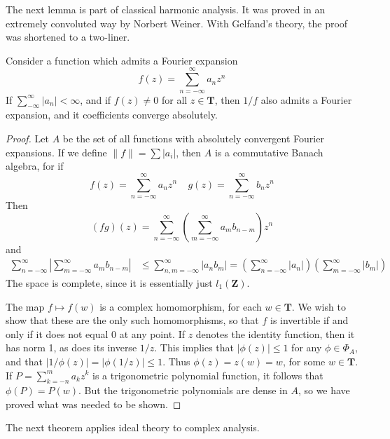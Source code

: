 The next lemma is part of classical harmonic analysis. It was proved in an extremely convoluted way by Norbert Weiner. With Gelfand's theory, the proof was shortened to a two-liner.

\begin{lemma}
    Consider a function which admits a Fourier expansion
    \[ f(z) = \sum_{n = -\infty}^\infty a_n z^n \]
    If $\sum_{-\infty}^\infty |a_n| < \infty$, and if $f(z) \neq 0$ for all $z \in \mathbf{T}$, then $1/f$ also admits a Fourier expansion, and it coefficients converge absolutely.
\end{lemma}
\begin{proof}
    Let $A$ be the set of all functions with absolutely convergent Fourier expansions. If we define $\| f \| = \sum |a_i|$, then $A$ is a commutative Banach algebra, for if
    \[ f(z) = \sum_{n = -\infty}^\infty a_n z^n\ \ \ \ \ g(z) = \sum_{n = -\infty}^\infty b_n z^n \]
    Then
    \[ (fg)(z) = \sum_{n = -\infty}^\infty \left ( \sum_{m = -\infty}^\infty a_m b_{n-m} \right) z^n \]
    and
    \begin{align*}
        \sum_{n = -\infty}^\infty \left| \sum_{m = -\infty}^\infty a_m b_{n-m} \right| &\leq \sum_{n,m = -\infty}^\infty |a_n b_m| = \left( \sum_{n = -\infty}^\infty |a_n| \right) \left( \sum_{m = -\infty}^\infty |b_m| \right)
    \end{align*}
    The space is complete, since it is essentially just $l_1(\mathbf{Z})$.

    The map $f \mapsto f(w)$ is a complex homomorphism, for each $w \in \mathbf{T}$. We wish to show that these are the only such homomorphisms, so that $f$ is invertible if and only if it does not equal 0 at any point. If $z$ denotes the identity function, then it has norm 1, as does its inverse $1/z$. This implies that $|\phi(z)| \leq 1$ for any $\phi \in \Phi_A$, and that $|1/\phi(z)| = |\phi(1/z)| \leq 1$. Thus $\phi(z) = z(w) = w$, for some $w \in \mathbf{T}$. If $P = \sum_{k = -n}^m a_k z^k$ is a trigonometric polynomial function, it follows that $\phi(P) = P(w)$. But the trigonometric polynomials are dense in $A$, so we have proved what was needed to be shown.
\end{proof}

The next theorem applies ideal theory to complex analysis.

